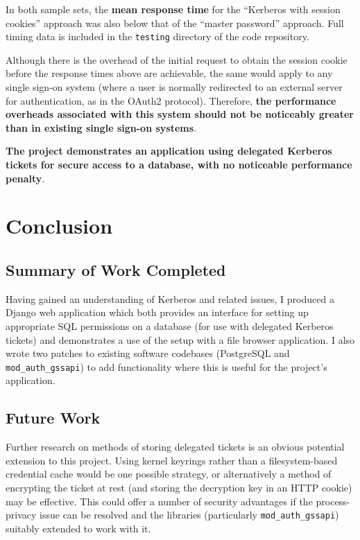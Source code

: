 \documentclass[12pt]{report}
\begin{document}
In both sample sets, the \textbf{mean response time} for the ``Kerberos with session cookies'' approach was also below that of the ``master password'' approach. Full timing data is included in the \texttt{testing} directory of the code repository.

Although there is the overhead of the initial request to obtain the session cookie before the response times above are achievable, the same would apply to any single sign-on system (where a user is normally redirected to an external server for authentication, as in the OAuth2 protocol). Therefore, \textbf{the performance overheads associated with this system should not be noticeably greater than in existing single sign-on systems}.

\textbf{The project demonstrates an application using delegated Kerberos tickets for secure access to a database, with no noticeable performance penalty}.

\chapter{Conclusion}
\section{Summary of Work Completed}
Having gained an understanding of Kerberos and related issues, I produced a Django web application which both provides an interface for setting up appropriate SQL permissions on a database (for use with delegated Kerberos tickets) and demonstrates a use of the setup with a file browser application. I also wrote two patches to existing software codebases (PostgreSQL and \verb+mod_auth_gssapi+) to add functionality where this is useful for the project's application.

\section{Future Work}
\label{sec:future_work}
Further research on methods of storing delegated tickets is an obvious potential extension to this project. Using kernel keyrings rather than a filesystem-based credential cache would be one possible strategy, or alternatively a method of encrypting the ticket at rest (and storing the decryption key in an HTTP cookie) may be effective. This could offer a number of security advantages if the process-privacy issue can be resolved and the libraries (particularly \verb+mod_auth_gssapi+) suitably extended to work with it.
\end{document}
